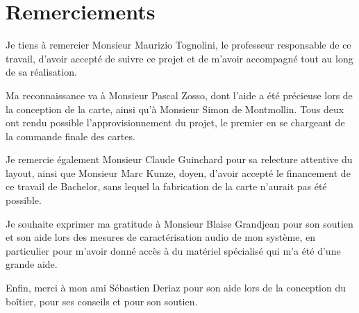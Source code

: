 \chapter*{Remerciements}

Je tiens à remercier Monsieur Maurizio Tognolini, le professeur responsable de ce travail, d'avoir accepté de suivre ce projet et de m'avoir accompagné tout au long de sa réalisation.

Ma reconnaissance va à Monsieur Pascal Zosso, dont l'aide a été précieuse lors de la conception de la carte, ainsi qu'à Monsieur Simon de Montmollin. Tous deux ont rendu possible l'approvisionnement du projet, le premier en se chargeant de la commande finale des cartes.

Je remercie également Monsieur Claude Guinchard pour sa relecture attentive du layout, ainsi que Monsieur Marc Kunze, doyen, d'avoir accepté le financement de ce travail de Bachelor, sans lequel la fabrication de la carte n'aurait pas été possible.

Je souhaite exprimer ma gratitude à Monsieur Blaise Grandjean pour son soutien et son aide lors des mesures de caractérisation audio de mon système, en particulier pour m'avoir donné accès à du matériel spécialisé qui m'a été d'une grande aide.

Enfin, merci à mon ami Sébastien Deriaz pour son aide lors de la conception du boîtier, pour ses conseils et pour son soutien.
